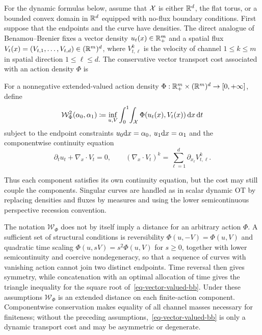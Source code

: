 For the dynamic formulas below, assume that $\mathcal{X}$ is either $\mathbb{R}^d$, the flat torus, or a bounded convex domain in $\mathbb{R}^d$ equipped with no-flux boundary conditions. First suppose that the endpoints and the curve have densities. The direct analogue of Benamou--Brenier fixes a vector density $u_t(x)\in\mathbb{R}_+^m$ and a spatial flux
$V_t(x)=(V_{t,1},\ldots,V_{t,d})\in(\mathbb{R}^m)^d$, where $V_{t,\ell}^k$ is the velocity of channel $1\leq k\leq m$ in spatial direction $1\leq\ell\leq d$. The conservative vector transport cost associated with an action density $\Phi$ is
\begin{defn}\label{def-vector-valued-dynamic-transport}
For a nonnegative extended-valued action density $\Phi:\mathbb{R}_+^m\times(\mathbb{R}^m)^d\to[0,+\infty]$, define
\begin{equation}\label{eq-vector-valued-bb}
	\mathcal W_{\Phi}^2(\alpha_0,\alpha_1)
	\coloneqq
	\inf_{u,V}
	\int_0^1\!\int_{\mathcal{X}}
	\Phi(u_t(x),V_t(x))\,\mathrm{d} x\,\mathrm{d} t
\end{equation}
subject to the endpoint constraints $u_0\mathrm{d} x=\alpha_0$, $u_1\mathrm{d} x=\alpha_1$ and the componentwise continuity equation
\begin{equation}\label{eq-vector-valued-continuity}
	\partial_t u_t+\nabla_x\cdot V_t=0,
	\qquad
	(\nabla_x\cdot V_t)^k=\sum_{\ell=1}^d \partial_{x_\ell} V_{t,\ell}^k.
\end{equation}
\end{defn}
Thus each component satisfies its own continuity equation, but the cost may still couple the components. Singular curves are handled as in scalar dynamic OT by replacing densities and fluxes by measures and using the lower semicontinuous perspective recession convention.

The notation $\mathcal W_\Phi$ does not by itself imply a distance for an arbitrary action $\Phi$. A sufficient set of structural conditions is reversibility $\Phi(u,-V)=\Phi(u,V)$ and quadratic time scaling $\Phi(u,sV)=s^2\Phi(u,V)$ for $s\geq0$, together with lower semicontinuity and coercive nondegeneracy, so that a sequence of curves with vanishing action cannot join two distinct endpoints. Time reversal then gives symmetry, while concatenation with an optimal allocation of time gives the triangle inequality for the square root of~\eqref{eq-vector-valued-bb}. Under these assumptions $\mathcal W_\Phi$ is an extended distance on each finite-action component. Componentwise conservation makes equality of all channel masses necessary for finiteness; without the preceding assumptions,~\eqref{eq-vector-valued-bb} is only a dynamic transport cost and may be asymmetric or degenerate.

